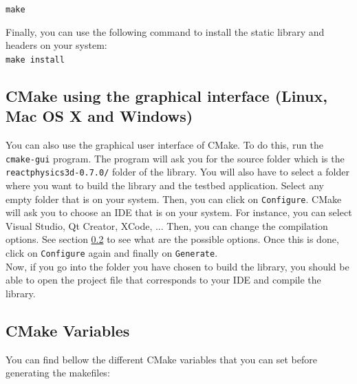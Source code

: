 \documentclass[a4paper,12pt]{article}
\begin{document}
    \texttt{make}

    Finally, you can use the following command to install the static library and headers on your system: \\

    \texttt{make install}

    \subsection{CMake using the graphical interface (Linux, Mac OS X and Windows)}

     You can also use the graphical user interface of CMake. To do this,
     run the \texttt{cmake-gui} program. The program will ask you for the
     source folder which is the \texttt{reactphysics3d-0.7.0/} folder of
     the library. You will also have to select a folder where you want to
     build the library and the testbed application. Select any empty folder that
     is on your system. Then, you can click on \texttt{Configure}. CMake will ask you to choose an IDE that is on
     your system. For instance, you can select Visual Studio, Qt Creator, XCode, ... Then, you
     can change the compilation options. See section \ref{sec:cmakevariables} to see what are the possible options.
     Once this is done, click on \texttt{Configure} again and finally on \texttt{Generate}. \\

     Now, if you go into the folder you have chosen to build the
     library, you should be able to open the project file that corresponds to your IDE and compile
     the library. \\

     \subsection{CMake Variables}
     \label{sec:cmakevariables}

     You can find bellow the different CMake variables that you can set before generating the makefiles:
\end{document}
